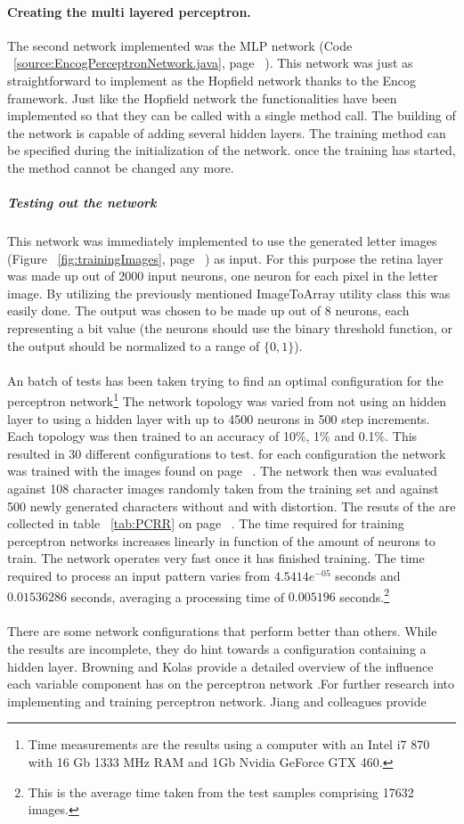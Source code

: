 \documentclass[pdftex,a4paper,12pt,twoside]{report}
\theoremstyle{plain} \newtheorem{theorem}{Theorem} \newtheorem{proposition}{Proposition} \newtheorem{lemma}{Lemma} \newtheorem*{corollary}{Corollary}
\theoremstyle{definition} \newtheorem{definition}{Definition} \newtheorem{conjecture}{Conjecture} \newtheorem*{example}{Example} \newtheorem{algorithm}{Algorithm}
\theoremstyle{remark} \newtheorem*{remark}{Remark} \newtheorem*{note}{Note} \newtheorem{case}{Case}
\begin{document}
\paragraph{Creating the multi layered perceptron.}
The second network implemented was the MLP network (Code ~\ref{source:EncogPerceptronNetwork.java}, page ~\pageref{source:EncogPerceptronNetwork.java}). This network was just as straightforward to implement as the Hopfield network thanks to the Encog framework. Just like the Hopfield network the functionalities have been implemented so that they can be called with a single method call. The building of the network is capable of adding several hidden layers. The training method can be specified during the initialization of the network. once the training has started, the method cannot be changed any more.
\subparagraph{Testing out the network}
This network was immediately implemented to use the generated letter images (Figure ~\ref{fig:trainingImages}, page ~\pageref{fig:trainingImages}) as input. For this purpose the retina layer was made up out of 2000 input neurons, one neuron for each pixel in the letter image. By utilizing the previously mentioned ImageToArray utility class this was easily done. The output was chosen to be made up out of 8 neurons, each representing a bit value (the neurons should use the binary threshold function, or the output should be normalized to a range of $\{0,1\}$).\\\\An batch of tests has been taken trying to find an optimal configuration for the perceptron network\footnote{Time measurements are the results using a computer with an Intel i7 870 with 16 Gb 1333 MHz RAM and 1Gb Nvidia GeForce GTX 460.} The network topology was varied from not using an hidden layer to using a hidden layer with up to 4500 neurons in 500 step increments. Each topology was then trained to an accuracy of 10\%, 1\% and 0.1\%. This resulted in 30 different configurations to test. for each configuration the network was trained with the images found on page ~\pageref{fig:trainingImages}. The network then was evaluated against 108 character images randomly taken from the training set and against 500 newly generated characters without and with distortion. The resuts of the are collected in table ~\ref{tab:PCRR} on page ~\pageref{tab:PCRR}. The time required for training perceptron networks increases linearly in function of the amount of neurons to train. The network operates very fast once it has finished training. The time required to process an input pattern varies from $4.5414e^{-05}$ seconds and $0.01536286$ seconds, averaging a processing time of $0.005196$ seconds.\footnote{This is the average time taken from the test samples comprising 17632 images.}\\\\ There are some network configurations that perform better than others. While the results are incomplete, they do hint towards a configuration containing a hidden layer. Browning and Kolas provide a detailed overview of the influence each variable component has on the perceptron network \citep{Browning2007}.For further research into implementing and training perceptron network. Jiang and colleagues provide 
\end{document}
